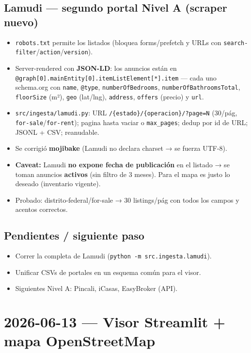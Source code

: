 \documentclass[11pt]{article}
\newcommand{\codigo}[1]{\texttt{#1}}
\newcommand{\pend}{\item[\textcolor{acento}{$\square$}]}
\begin{document}
\subsection*{Lamudi — segundo portal Nivel A (scraper nuevo)}
\begin{itemize}
  \item \codigo{robots.txt} permite los listados (bloquea forms/prefetch y URLs con
        \codigo{search-filter}/\codigo{action}/\codigo{version}).
  \item Server-rendered con \textbf{JSON-LD}: los anuncios están en
        \codigo{@graph[0].mainEntity[0].itemListElement[*].item} — cada uno
        schema.org con \codigo{name}, \codigo{@type}, \codigo{numberOfBedrooms},
        \codigo{numberOfBathroomsTotal}, \codigo{floorSize} (m²), \codigo{geo}
        (lat/lng), \codigo{address}, \codigo{offers} (precio) y \codigo{url}.
  \item \codigo{src/ingesta/lamudi.py}: URL \codigo{/\{estado\}/\{operacion\}/?page=N}
        (30/pág, \codigo{for-sale}/\codigo{for-rent}); pagina hasta vaciar o
        \codigo{max\_pages}; dedup por id de URL; JSONL + CSV; reanudable.
  \item Se corrigió \textbf{mojibake} (Lamudi no declara charset → se fuerza UTF-8).
  \item \textbf{Caveat:} Lamudi \textbf{no expone fecha de publicación} en el
        listado → se toman anuncios \textbf{activos} (sin filtro de 3 meses).
        Para el mapa es justo lo deseado (inventario vigente).
  \item Probado: distrito-federal/for-sale → 30 listings/pág con todos los campos
        y acentos correctos.
\end{itemize}

\subsection*{Pendientes / siguiente paso}
\begin{itemize}
  \pend Correr la completa de Lamudi (\codigo{python -m src.ingesta.lamudi}).
  \pend Unificar CSVs de portales en un esquema común para el visor.
  \pend Siguientes Nivel A: Pincali, iCasas, EasyBroker (API).
\end{itemize}

\section*{2026-06-13 — Visor Streamlit + mapa OpenStreetMap}
\end{document}
